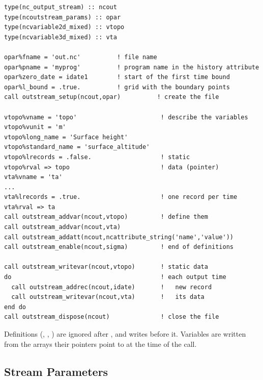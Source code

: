 \begin{lstlisting}
type(nc_output_stream) :: ncout
type(ncoutstream_params) :: opar
type(ncvariable2d_mixed) :: vtopo
type(ncvariable3d_mixed) :: vta

opar%fname = 'out.nc'          ! file name
opar%pname = 'myprog'          ! program name in the history attribute
opar%zero_date = idate1        ! start of the first time bound
opar%l_bound = .true.          ! grid with the boundary points
call outstream_setup(ncout,opar)          ! create the file

vtopo%vname = 'topo'                       ! describe the variables
vtopo%vunit = 'm'
vtopo%long_name = 'Surface height'
vtopo%standard_name = 'surface_altitude'
vtopo%lrecords = .false.                   ! static
vtopo%rval => topo                         ! data (pointer)
vta%vname = 'ta'
...
vta%lrecords = .true.                      ! one record per time
vta%rval => ta
call outstream_addvar(ncout,vtopo)         ! define them
call outstream_addvar(ncout,vta)
call outstream_addatt(ncout,ncattribute_string('name','value'))
call outstream_enable(ncout,sigma)         ! end of definitions

call outstream_writevar(ncout,vtopo)       ! static data
do                                         ! each output time
  call outstream_addrec(ncout,idate)       !   new record
  call outstream_writevar(ncout,vta)       !   its data
end do
call outstream_dispose(ncout)              ! close the file
\end{lstlisting}

\noindent Definitions (, , ) are
ignored after , and writes before it. Variables are
written from the arrays their pointers point to at the time of the call.

\subsection{Stream Parameters}

